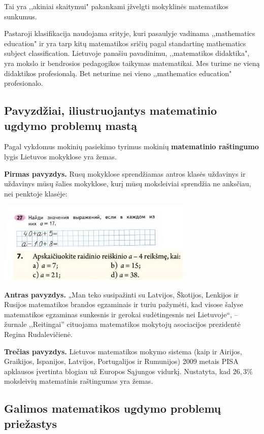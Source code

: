 \documentclass{article}
\begin{document}
Tai yra ,,akiniai skaitymui" pakankami įžvelgti mokyklinės matematikos sunkumus.

Pastaroji klasifikacija naudojama srityje, kuri pasaulyje vadinama ,,mathematics education" ir yra tarp kitų matematikos sričių pagal standartinę mathematics subject classification. Lietuvoje panašiu pavadinimu, ,,matematikos didaktika", yra mokslo ir bendrosios pedagogikos taikymas matematikai. Mes turime ne vieną didaktikos profesionalą. Bet neturime nei vieno ,,mathematics education" profesionalo.

\subsection{Pavyzdžiai, iliustruojantys matematinio ugdymo problemų mastą}
Pagal vykdomus mokinių pasiekimo tyrimus mokinių \textbf{matematinio raštingumo} lygis Lietuvos mokyklose yra žemas. 

\textbf{Pirmas pavyzdys.} Rusų mokyklose sprendžiamas antros klasės uždavinys ir uždavinys mūsų šalies mokyklose, kurį mūsų moksleiviai sprendžia ne anksčiau, nei penktoje klasėje:

\includegraphics[width=0.7\textwidth]{ruvslt.jpg}

\textbf{Antras pavyzdys.} „Man teko susipažinti su Latvijos, Škotijos, Lenkijos ir Rusijos matematikos brandos egzaminais ir turiu pažymėti, kad visose šalyse matematikos egzaminas sunkesnis ir gerokai sudėtingesnis nei Lietuvoje“, – žurnale ,,Reitingai'' cituojama matematikos mokytojų asociacijos prezidentė Regina Rudalevičienė.

\textbf{Trečias pavyzdys.}
Lietuvos matematikos mokymo sistema (kaip ir Airijos, Graikijos, Ispanijos, Latvijos, Portugalijos ir Rumunijos) 2009 metais PISA apklausos įvertinta blogiau už Europos Sąjungos vidurkį. Nustatyta, kad $26,3\%$ moksleivių matematinis raštingumas yra žemas.

\subsection{Galimos matematikos ugdymo problemų priežastys}
\end{document}
